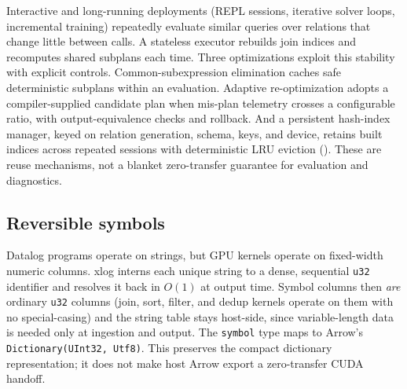 Interactive and long-running deployments (REPL sessions, iterative solver loops, incremental training) repeatedly evaluate similar queries over relations that change little between calls. A stateless executor rebuilds join indices and recomputes shared subplans each time. Three optimizations exploit this stability with explicit controls. Common-subexpression elimination caches safe deterministic subplans within an evaluation. Adaptive re-optimization adopts a compiler-supplied candidate plan when mis-plan telemetry crosses a configurable ratio, with output-equivalence checks and rollback. And a persistent hash-index manager, keyed on relation generation, schema, keys, and device, retains built indices across repeated sessions with deterministic LRU eviction (). These are reuse mechanisms, not a blanket zero-transfer guarantee for evaluation and diagnostics.

\subsection{Reversible symbols}

Datalog programs operate on strings, but GPU kernels operate on fixed-width numeric columns. xlog interns each unique string to a dense, sequential \texttt{u32} identifier and resolves it back in $O(1)$ at output time. Symbol columns then \emph{are} ordinary \texttt{u32} columns (join, sort, filter, and dedup kernels operate on them with no special-casing) and the string table stays host-side, since variable-length data is needed only at ingestion and output. The \texttt{symbol} type maps to Arrow's \texttt{Dictionary(UInt32, Utf8)}. This preserves the compact dictionary representation; it does not make host Arrow export a zero-transfer CUDA handoff.
